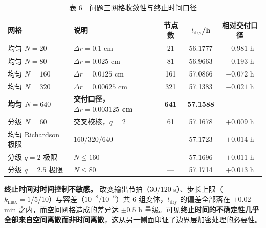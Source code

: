 \begin{table}[H]
  \centering
  \caption{表 6　问题三网格收敛性与终止时间口径}
  \label{tab:p3_grid}
  \begin{tabular}{llccc}
    \toprule
    网格 & 说明 & 节点数 & $t_{\text{dry}}$/h & 相对交付口径 \\
    \midrule
    均匀 $N=20$  & $\Delta r=0.1$ cm     & 21  & 56.1777 & $-0.981$ h \\
    均匀 $N=80$  & $\Delta r=0.025$ cm   & 81  & 56.9663 & $-0.193$ h \\
    均匀 $N=160$ & $\Delta r=0.0125$ cm  & 161 & 57.0866 & $-0.072$ h \\
    均匀 $N=320$ & $\Delta r=0.00625$ cm & 321 & 57.1383 & $-0.021$ h \\
    \textbf{均匀 $N=640$} & \textbf{交付口径，$\Delta r=0.003125$ cm} & \textbf{641} & \textbf{57.1588} & --- \\
    分级 $N=60$  & 交叉校核，$q=2$ & 61 & 57.1678 & $+0.009$ h \\
    均匀 Richardson 极限 & $160/320/640$ & --- & 57.1723 & $+0.014$ h \\
    分级 $q=2$ 极限 & $N\le160$ & --- & 57.1696 & $+0.011$ h \\
    分级 $q=2.5$ 极限 & $N\le80$ & --- & 57.1714 & $+0.013$ h \\
    \bottomrule
  \end{tabular}
\end{table}

\textbf{终止时间对时间控制不敏感。} 改变输出节拍（$30/120$ s）、步长上限（$k_{\max}=1/5/10$）与容差（$10^{-8}/10^{-6}$）共 $6$ 组变体，$t_{\text{dry}}$ 的偏差全部落在 $\pm0.02$ min 之内，而空间网格造成的差异达 $\pm0.5$ h 量级。可见\textbf{终止时间的不确定性几乎全部来自空间离散而非时间离散}，这从另一侧面印证了边界层加密处理的必要性。
